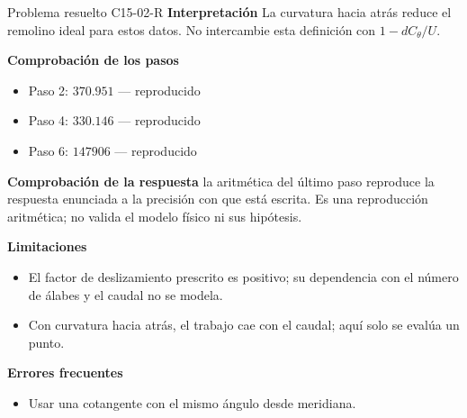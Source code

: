 \documentclass[10pt,openany]{book}
\begin{document}
\begin{studiumworked}{Problema resuelto C15-02-R}
\noindent\textbf{Interpretación}
La curvatura hacia atrás reduce el remolino ideal para estos datos. No intercambie esta definición con $1-dC_\theta/U$.

\noindent\textbf{Comprobación de los pasos}
\begin{itemize}
\item Paso 2: $370.951$ — reproducido
\item Paso 4: $330.146$ — reproducido
\item Paso 6: $147906$ — reproducido
\end{itemize}

\noindent\textbf{Comprobación de la respuesta} la aritmética del último paso reproduce la respuesta enunciada a la precisión con que está escrita. Es una reproducción aritmética; no valida el modelo físico ni sus hipótesis.

\noindent\textbf{Limitaciones}
\begin{itemize}
\item El factor de deslizamiento prescrito es positivo; su dependencia con el número de álabes y el caudal no se modela.
\item Con curvatura hacia atrás, el trabajo cae con el caudal; aquí solo se evalúa un punto.
\end{itemize}

\noindent\textbf{Errores frecuentes}
\begin{itemize}
\item Usar una cotangente con el mismo ángulo desde meridiana.
\end{itemize}
\end{studiumworked}
\end{document}

